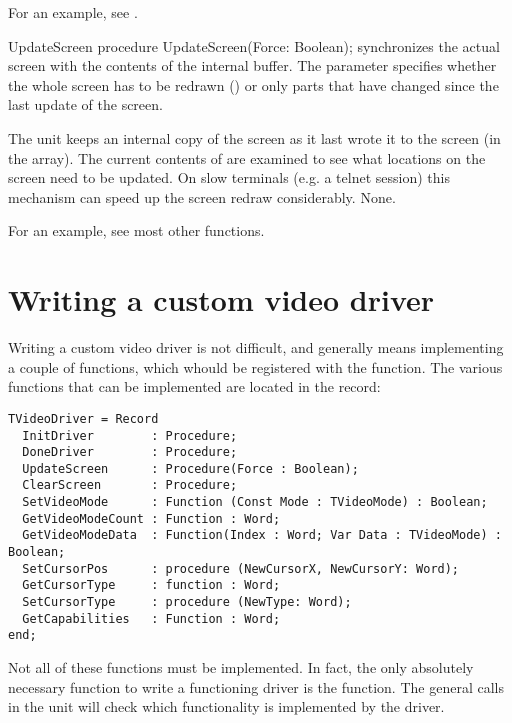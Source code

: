 For an example, see .

\begin{procedure}{UpdateScreen}
\Declaration
procedure UpdateScreen(Force: Boolean); 
\Description
{} synchronizes the actual screen with the contents
of the  internal buffer. The parameter 
specifies whether the whole screen has to be redrawn ()
or only parts that have changed since the last update of the screen.

The  unit keeps an internal copy of the screen as it last 
wrote it to the screen (in the  array). The current 
contents of  are examined to see what locations on the 
screen need to be updated. On slow terminals (e.g. a \linux telnet 
session) this mechanism can speed up the screen redraw considerably.
\Errors
None.
\SeeAlso
{}
\end{procedure}

For an example, see most other functions.

\section{Writing a custom video driver}
\label{se:viddriver}
Writing a custom video driver is not difficult, and generally means
implementing a couple of functions, which whould be registered with
the  function. The various functions that can be
implemented are located in the  record:
\begin{verbatim}
TVideoDriver = Record
  InitDriver        : Procedure;
  DoneDriver        : Procedure;
  UpdateScreen      : Procedure(Force : Boolean);
  ClearScreen       : Procedure;
  SetVideoMode      : Function (Const Mode : TVideoMode) : Boolean;
  GetVideoModeCount : Function : Word;
  GetVideoModeData  : Function(Index : Word; Var Data : TVideoMode) : Boolean;
  SetCursorPos      : procedure (NewCursorX, NewCursorY: Word);
  GetCursorType     : function : Word;
  SetCursorType     : procedure (NewType: Word);
  GetCapabilities   : Function : Word;
end;
\end{verbatim}
Not all of these functions must be implemented. In fact, the only absolutely
necessary function to write a functioning driver is the  
function. The general calls in the  unit will check which
functionality is implemented by the driver.

